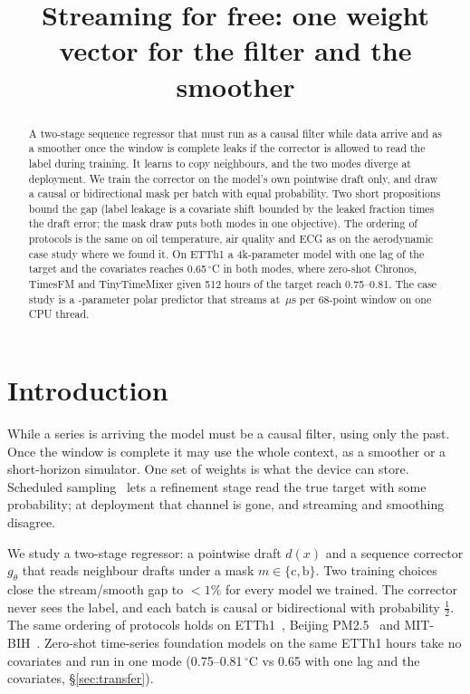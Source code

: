 \documentclass{article}
\title{Streaming for free: one weight vector for the filter and the smoother}
\begin{document}
\maketitle

\begin{abstract}
A two-stage sequence regressor that must run as a causal filter while data arrive and as a smoother once the window is complete leaks if the corrector is allowed to read the label during training. It learns to copy neighbours, and the two modes diverge at deployment. We train the corrector on the model's own pointwise draft only, and draw a causal or bidirectional mask per batch with equal probability. Two short propositions bound the gap (label leakage is a covariate shift bounded by the leaked fraction times the draft error; the mask draw puts both modes in one objective). The ordering of protocols is the same on oil temperature, air quality and ECG as on the aerodynamic case study where we found it. On ETTh1 a 4k-parameter model with one lag of the target and the covariates reaches 0.65\,$^\circ$C in both modes, where zero-shot Chronos, TimesFM and TinyTimeMixer given 512 hours of the target reach 0.75--0.81. The case study is a \NParamsMain-parameter polar predictor that streams at \MainFusedUs\,$\mu$s per 68-point window on one CPU thread.
\end{abstract}

\section{Introduction}
\label{sec:intro}
While a series is arriving the model must be a causal filter, using only the past. Once the window is complete it may use the whole context, as a smoother or a short-horizon simulator. One set of weights is what the device can store. Scheduled sampling~\citep{bengio2015scheduled} lets a refinement stage read the true target with some probability; at deployment that channel is gone, and streaming and smoothing disagree.

We study a two-stage regressor: a pointwise draft $d(x)$ and a sequence corrector $g_\theta$ that reads neighbour drafts under a mask $m\in\{\mathrm{c},\mathrm{b}\}$. Two training choices close the stream/smooth gap to $<1\%$ for every model we trained. The corrector never sees the label, and each batch is causal or bidirectional with probability $\tfrac12$. The same ordering of protocols holds on ETTh1~\citep{zhou2021informer}, Beijing PM2.5~\citep{liang2015pm25} and MIT-BIH~\citep{moody2001mitbih}. Zero-shot time-series foundation models on the same ETTh1 hours take no covariates and run in one mode (0.75--0.81\,$^\circ$C vs 0.65 with one lag and the covariates, \S\ref{sec:transfer}).
\end{document}
